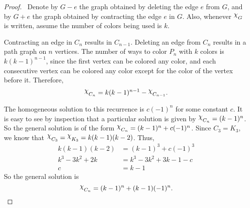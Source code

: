 \documentclass[12pt]{article}
\begin{document}
\begin{enumerate}[leftmargin=0cm,itemindent=.5cm,labelwidth=\itemindent,labelsep=0cm,align=left]
\begin{figure}[h!]
\begin{center}
\end{center}
\end{figure}

\begin{proof}
\ Denote by $G-e$ the graph obtained by deleting the edge $e$ from $G$, and by $G+e$ the graph obtained by contracting the edge $e$ in $G$.  Also, whenever $\raisebox{3pt}{$\chi$}_G$ is written, assume the number of colors being used is $k$.

Contracting an edge in $C_n$ results in $C_{n-1}$.  Deleting an edge from $C_n$ results in a path graph on $n$ vertices.  The number of ways to color $P_n$ with $k$ colors is $k(k-1)^{n-1}$, since the first vertex can be colored any color, and each consecutive vertex can be colored any color except for the color of the vertex before it.  Therefore, $$\raisebox{3pt}{$\chi$}_{C_n} = k(k-1)^{n-1} - \raisebox{3pt}{$\chi$}_{C_{n-1}}.$$

The homogeneous solution to this recurrence is $c(-1)^n$ for some constant $c$.  It is easy to see by inspection that a particular solution is given by $\raisebox{3pt}{$\chi$}_{C_n} = (k-1)^n$.  So the general solution is of the form $\raisebox{3pt}{$\chi$}_{C_n} = (k-1)^n + c(-1)^n$.  Since $C_3 = K_3$, we know that $\raisebox{3pt}{$\chi$}_{C_3} = \raisebox{3pt}{$\chi$}_{K_3} = k(k-1)(k-2)$.  Thus,
\begin{align*}
k(k-1)(k-2) &= (k-1)^3 + c(-1)^3 \\
k^3 - 3k^2 + 2k &= k^3 - 3k^2 + 3k - 1 - c \\
c &= k - 1
\end{align*}
So the general solution is $$\raisebox{3pt}{$\chi$}_{C_n} = (k-1)^n + (k-1)(-1)^n.$$


\end{proof}
\end{enumerate}
\end{document}
